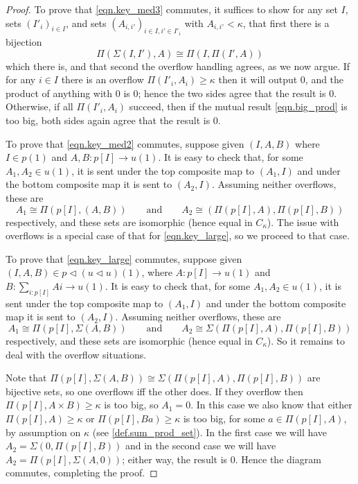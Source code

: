 \documentclass[11pt, one side, article]{memoir}
\theoremstyle{definition}
\theoremstyle{plain}
\newcommand{\0}{\textsf{0}}
\newcommand{\1}{\tn{\textsf{1}}}
\newcommand{\tri}{\mathbin{\triangleleft}}
\newcommand{\qqand}{\qquad\text{and}\qquad}
\begin{document}
\begin{proof}
To prove that \eqref{eqn.key_med3} commutes, it suffices to show for any set $I$, sets $(I'_i)_{i\in I}$, and sets $(A_{i,i'})_{i\in I, i'\in I'_i}$ with $A_{i,i'}<\kappa$, that first there is a bijection
\begin{equation}\label{eqn.big_prod}
\Pi(\Sigma(I,I'),A)\cong\Pi(I,\Pi(I',A))
\end{equation}
which there is, and that second the overflow handling agrees, as we now argue. If for any $i\in I$ there is an overflow $\Pi(I'_i,A_i)\geq\kappa$ then it will output $0$, and the product of anything with $0$ is $0$; hence the two sides agree that the result is $0$. Otherwise, if all $\Pi(I'_i,A_i)$ succeed, then if the mutual result \eqref{eqn.big_prod} is too big, both sides again agree that the result is $0$.

To prove that \eqref{eqn.key_med2} commutes, suppose given $(I,A,B)$ where $I\in p(1)$ and $A,B\colon p[I]\to u(1)$. It is easy to check that, for some $A_1,A_2\in u(1)$, it is sent under the top composite map to  $(A_1,I)$ and under the bottom composite map it is sent to $(A_2,I)$. Assuming neither overflows, these are
\[
  A_1\cong\Pi(p[I],(A, B))
  \qqand
	A_2\cong(\Pi(p[I],A),\Pi(p[I],B))
\] 
respectively, and these sets are isomorphic (hence equal in $C_\kappa$). The issue with overflows is a special case of that for \eqref{eqn.key_large}, so we proceed to that case.

To prove that \eqref{eqn.key_large} commutes, suppose given $(I,A,B)\in p\tri(u\tri u)(1)$, where $A\colon p[I]\to u(1)$ and $B\colon\sum_{i:p[I]}Ai\to u(1)$. It is easy to check that, for some $A_1,A_2\in u(1)$, it is sent under the top composite map to  $(A_1,I)$ and under the bottom composite map it is sent to $(A_2,I)$. Assuming neither overflows, these are 
\[
  A_1\cong\Pi(p[I],\Sigma(A, B))
  \qqand
	A_2\cong\Sigma(\Pi(p[I],A),\Pi(p[I],B))
\] 
respectively, and these sets are isomorphic (hence equal in $C_\kappa$). So it remains to deal with the overflow situations.

Note that $\Pi(p[I],\Sigma(A, B))\cong\Sigma(\Pi(p[I],A),\Pi(p[I],B))$ are bijective sets, so one overflows iff the other does. If they overflow then $\Pi(p[I],A\times B)\geq\kappa$ is too big, so $A_1=0$. In this case we also know that either $\Pi(p[I],A)\geq\kappa$ or $\Pi(p[I],Ba)\geq\kappa$ is too big, for some $a\in\Pi(p[I],A)$, by assumption on $\kappa$ (see \cref{def.sum_prod_set}). In the first case we will have $A_2=\Sigma(0,\Pi(p[I],B))$ and in the second case we will have $A_2=\Pi(p[I],\Sigma(A, 0))$; either way, the result is $0$. Hence the diagram commutes, completing the proof.
\end{proof}
\end{document}
